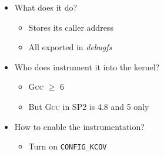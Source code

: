 \begin{frame}{\syz}{}

  \begin{itemize}
    \item What does it do?
    \pause
    \begin{itemize}
      \item Stores its caller address
      \item All exported in \textit{debugfs}
    \end{itemize}

    \pause

    \item Who does instrument it into the kernel?
    \pause
    \begin{itemize}
      \item \textsc{Gcc} $\geq$ 6

      \pause

      \item But \textsc{Gcc} in SP2 is 4.8 and 5 only
    \end{itemize}

    \pause

    \item How to enable the instrumentation?
    \pause
    \begin{itemize}
      \item Turn on \texttt{CONFIG\_KCOV}
    \end{itemize}
  \end{itemize}

\end{frame}

